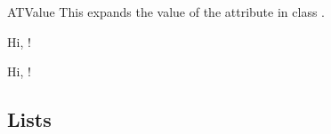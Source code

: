 \documentclass[a4paper, 11pt]{article}
\begin{document}
\begin{Macrodef}{ATValue}{}{}
    This expands the value of the attribute  in class .
\end{Macrodef}

\begin{PDExample}
    Hi, !

    Hi, !
\end{PDExample}

\subsection{Lists}
\end{document}
